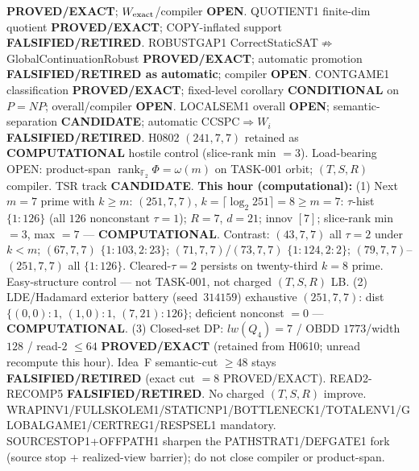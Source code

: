 \documentclass[11pt]{article}
\begin{document}
\textbf{PROVED/EXACT}; $W_{\rm exact}$/compiler \textbf{OPEN}.
QUOTIENT1 finite-dim quotient \textbf{PROVED/EXACT}; COPY-inflated support \textbf{FALSIFIED/RETIRED}.
ROBUSTGAP1 CorrectStaticSAT$\not\Rightarrow$GlobalContinuationRobust \textbf{PROVED/EXACT};
automatic promotion \textbf{FALSIFIED/RETIRED as automatic}; compiler \textbf{OPEN}.
CONTGAME1 classification \textbf{PROVED/EXACT}; fixed-level corollary \textbf{CONDITIONAL} on $P=NP$;
overall/compiler \textbf{OPEN}.
LOCALSEM1 overall \textbf{OPEN}; semantic-separation \textbf{CANDIDATE}; automatic CCSPC$\Rightarrow W_i$
\textbf{FALSIFIED/RETIRED}.
H0802 $(241,7,7)$ retained as \textbf{COMPUTATIONAL} hostile control (slice-rank min $=3$).
Load-bearing OPEN: product-span $\operatorname{rank}_{\mathbb F_2}\Phi=\omega(m)$ on TASK-001 orbit;
$(T,S,R)$ compiler. TSR track \textbf{CANDIDATE}.
\textbf{This hour (computational):}
(1) Next $m{=}7$ prime with $k{\ge}m$: $(251,7,7)$, $k=\lceil\log_2 251\rceil=8{\ge}m{=}7$:
$\tau$-hist $\{1{:}126\}$ (all $126$ nonconstant $\tau{=}1$); $R{=}7$, $d{=}21$; innov $[7]$;
slice-rank min $=3$, max $=7$ --- \textbf{COMPUTATIONAL}.
Contrast: $(43,7,7)$ all $\tau{=}2$ under $k{<}m$; $(67,7,7)$ $\{1{:}103,2{:}23\}$;
$(71,7,7)$/$(73,7,7)$ $\{1{:}124,2{:}2\}$; $(79,7,7)$--$(251,7,7)$ all $\{1{:}126\}$.
Cleared-$\tau{=}2$ persists on twenty-third $k{=}8$ prime. Easy-structure control --- not TASK-001,
not charged $(T,S,R)$ LB.
(2) LDE/Hadamard exterior battery (seed~$314159$) exhaustive $(251,7,7)$:
dist $\{(0,0){:}1,\,(1,0){:}1,\,(7,21){:}126\}$; deficient nonconst $=0$ --- \textbf{COMPUTATIONAL}.
(3) Closed-set DP: $lw(Q_4)=7$ / OBDD $1773$/width $128$ / read-$2$ $\le64$
\textbf{PROVED/EXACT} (retained from H0610; unread recompute this hour).
Idea~F semantic-cut $\ge48$ stays \textbf{FALSIFIED/RETIRED} (exact cut $=8$ PROVED/EXACT).
READ2-RECOMP5 \textbf{FALSIFIED/RETIRED}. No charged $(T,S,R)$ improve.
WRAPINV1/FULLSKOLEM1/STATICNP1/BOTTLENECK1/TOTALENV1/GLOBALGAME1/CERTREG1/RESPSEL1 mandatory.
SOURCESTOP1+OFFPATH1 sharpen the PATHSTRAT1/DEFGATE1 fork (source stop + realized-view barrier);
do not close compiler or product-span.
\end{document}
